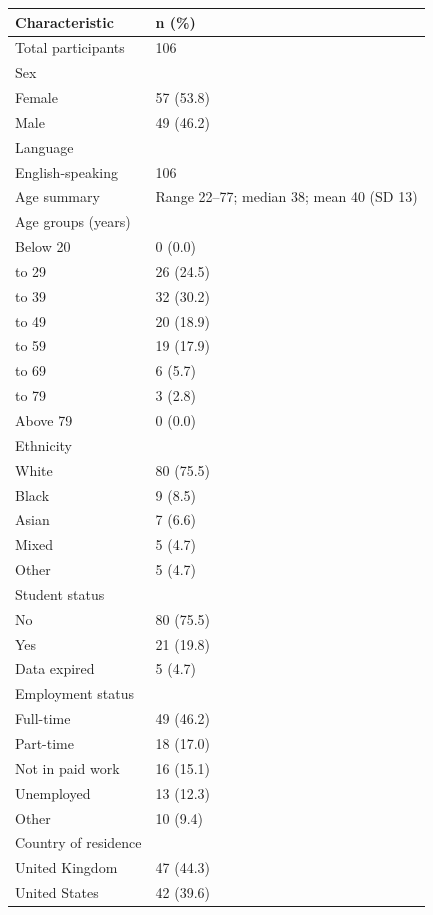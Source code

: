 \begin{table}[htbp]
\centering
\begin{tabular}{l l}
\hline
\textbf{Characteristic} & \textbf{n (\%)} \\
\hline
Total participants & 106 \\
\hline
Sex & \\
\quad Female & 57 (53.8) \\
\quad Male & 49 (46.2) \\
\hline
Language & \\
\quad English-speaking & 106 \\
\hline
Age summary & Range 22--77; median 38; mean 40 (SD 13) \\
Age groups (years) & \\
\quad Below 20 & 0 (0.0) \\
\quad 20 to 29 & 26 (24.5) \\
\quad 30 to 39 & 32 (30.2) \\
\quad 40 to 49 & 20 (18.9) \\
\quad 50 to 59 & 19 (17.9) \\
\quad 60 to 69 & 6 (5.7) \\
\quad 70 to 79 & 3 (2.8) \\
\quad Above 79 & 0 (0.0) \\
\hline
Ethnicity & \\
\quad White & 80 (75.5) \\
\quad Black & 9 (8.5) \\
\quad Asian & 7 (6.6) \\
\quad Mixed & 5 (4.7) \\
\quad Other & 5 (4.7) \\
\hline
Student status & \\
\quad No & 80 (75.5) \\
\quad Yes & 21 (19.8) \\
\quad Data expired & 5 (4.7) \\
\hline
Employment status & \\
\quad Full-time & 49 (46.2) \\
\quad Part-time & 18 (17.0) \\
\quad Not in paid work & 16 (15.1) \\
\quad Unemployed & 13 (12.3) \\
\quad Other & 10 (9.4) \\
\hline
Country of residence & \\
\quad United Kingdom & 47 (44.3) \\
\quad United States & 42 (39.6) \\

\end{tabular}
\end{table}
